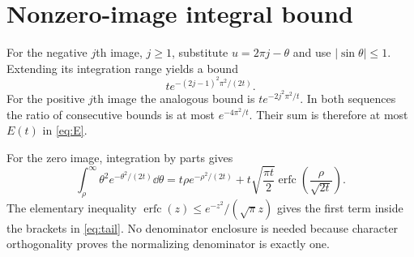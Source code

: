 \section{Nonzero-image integral bound}\label{app:tail}

For the negative $j$th image, $j\ge1$, substitute
$u=2\pi j-\theta$ and use $|\sin\theta|\le1$.  Extending its integration
range yields a bound
\[
t e^{-(2j-1)^2\pi^2/(2t)}.
\]
For the positive $j$th image the analogous bound is
$t e^{-2j^2\pi^2/t}$.  In both sequences the ratio of consecutive bounds is
at most $e^{-4\pi^2/t}$.  Their sum is therefore at most $E(t)$ in
\eqref{eq:E}.

For the zero image, integration by parts gives
\[
\int_\rho^\infty\theta^2e^{-\theta^2/(2t)}\dd\theta
=t\rho e^{-\rho^2/(2t)}
+t\sqrt{\frac{\pi t}{2}}\operatorname{erfc}
\left(\frac{\rho}{\sqrt{2t}}\right).
\]
The elementary inequality
$\operatorname{erfc}(z)\le e^{-z^2}/(\sqrt\pi z)$ gives the first term inside
the brackets in \eqref{eq:tail}.  No denominator enclosure is needed because
character orthogonality proves the normalizing denominator is exactly one.
